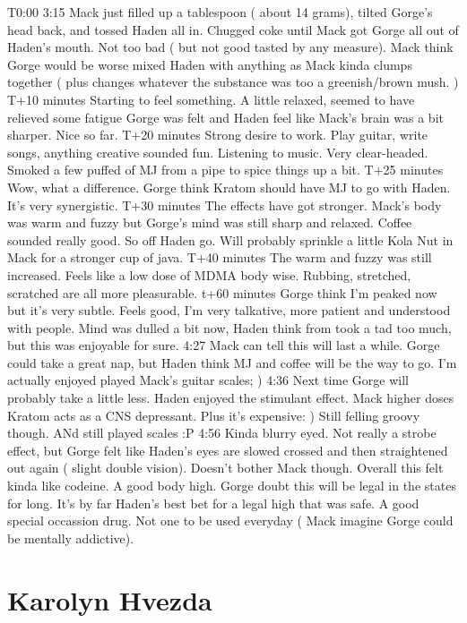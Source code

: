 \documentclass[12pt]{book}
\begin{document}
T0:00 3:15 Mack just filled up a tablespoon ( about 14 grams), tilted Gorge's head back, and tossed Haden all in. Chugged coke until Mack got Gorge all out of Haden's mouth. Not too bad ( but not good tasted by any measure). Mack think Gorge would be worse mixed Haden with anything as Mack kinda clumps together ( plus changes whatever the substance was too a greenish/brown mush. ) T+10 minutes Starting to feel something. A little relaxed, seemed to have relieved some fatigue Gorge was felt and Haden feel like Mack's brain was a bit sharper. Nice so far. T+20 minutes Strong desire to work. Play guitar, write songs, anything creative sounded fun. Listening to music. Very clear-headed. Smoked a few puffed of MJ from a pipe to spice things up a bit. T+25 minutes Wow, what a difference. Gorge think Kratom should have MJ to go with Haden. It's very synergistic. T+30 minutes The effects have got stronger. Mack's body was warm and fuzzy but Gorge's mind was still sharp and relaxed. Coffee sounded really good. So off Haden go. Will probably sprinkle a little Kola Nut in Mack for a stronger cup of java. T+40 minutes The warm and fuzzy was still increased. Feels like a low dose of MDMA body wise. Rubbing, stretched, scratched are all more pleasurable. t+60 minutes Gorge think I'm peaked now but it's very subtle. Feels good, I'm very talkative, more patient and understood with people. Mind was dulled a bit now, Haden think from took a tad too much, but this was enjoyable for sure. 4:27 Mack can tell this will last a while. Gorge could take a great nap, but Haden think MJ and coffee will be the way to go. I'm actually enjoyed played Mack's guitar scales; ) 4:36 Next time Gorge will probably take a little less. Haden enjoyed the stimulant effect. Mack higher doses Kratom acts as a CNS depressant. Plus it's expensive: ) Still felling groovy though. ANd still played scales :P 4:56 Kinda blurry eyed. Not really a strobe effect, but Gorge felt like Haden's eyes are slowed crossed and then straightened out again ( slight double vision). Doesn't bother Mack though. Overall this felt kinda like codeine. A good body high. Gorge doubt this will be legal in the states for long. It's by far Haden's best bet for a legal high that was safe. A good special occassion drug. Not one to be used everyday ( Mack imagine Gorge could be mentally addictive).



\chapter{Karolyn Hvezda}
\end{document}

